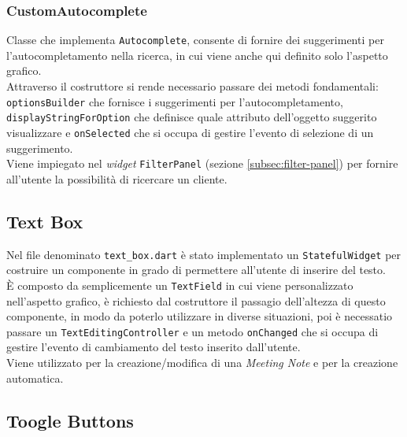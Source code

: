 \subsubsection*{CustomAutocomplete}
\label{subsubsec:custom-autocomplete}

Classe che implementa \lstinline{Autocomplete}\cite{site:autocomplete}, consente di fornire dei suggerimenti per l'autocompletamento nella ricerca, in cui viene anche qui definito solo l'aspetto grafico. \\
Attraverso il costruttore si rende necessario passare dei metodi fondamentali: \lstinline{optionsBuilder} che fornisce i suggerimenti per l'autocompletamento, \lstinline{displayStringForOption} che definisce quale attributo dell'oggetto suggerito visualizzare e \lstinline{onSelected} che si occupa di gestire l'evento di selezione di un suggerimento.\\
Viene impiegato nel \emph{widget} \lstinline{FilterPanel} (sezione \ref{subsec:filter-panel}) per fornire all'utente la possibilità di ricercare un cliente.

\subsection{Text Box}
\label{subsec:text-box}

Nel file denominato \lstinline{text_box.dart} è stato implementato un \lstinline{StatefulWidget} per costruire un componente in grado di permettere all'utente di inserire del testo.\\
È composto da semplicemente un \lstinline{TextField}\cite{site:text-field} in cui viene personalizzato nell'aspetto grafico, è richiesto dal costruttore il passagio dell'altezza di questo componente, in modo da poterlo utilizzare in diverse situazioni, poi è necessatio passare un \lstinline{TextEditingController}\cite{site:text-editing-controller} e un metodo \lstinline{onChanged} che si occupa di gestire l'evento di cambiamento del testo inserito dall'utente.\\
Viene utilizzato per la creazione/modifica di una \emph{Meeting Note} e per la creazione automatica.

\subsection{Toogle Buttons}
\label{subsec:toogle-buttons}


